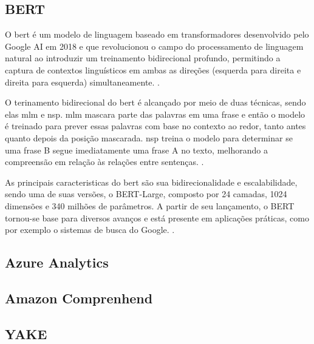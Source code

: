 \subsection{BERT}\label{subsec:bert}

O \gls{bert} é um modelo de linguagem baseado em transformadores desenvolvido pelo Google AI em 2018 e que revolucionou o campo do processamento de linguagem natural ao introduzir um treinamento bidirecional profundo, permitindo a captura de contextos linguísticos em ambas as direções (esquerda para direita e direita para esquerda) simultaneamente. \cite{Devlin2018}.

O terinamento bidirecional do \gls{bert} é alcançado por meio de duas técnicas, sendo elas \gls{mlm} e \gls{nsp}. \gls{mlm} mascara parte das palavras em uma frase e então o modelo é treinado para prever essas palavras com base no contexto ao redor, tanto antes quanto depois da posição mascarada. \gls{nsp} treina o modelo para determinar se uma frase B segue imediatamente uma frase A no texto, melhorando a compreensão em relação às relações entre sentenças. \cite{Devlin2018}.

As principais caracteristicas do \gls{bert} são sua bidirecionalidade e escalabilidade, sendo uma de suas versões, o BERT-Large, composto por 24 camadas, 1024 dimensões e 340 milhões de parâmetros. A partir de seu lançamento, o BERT tornou-se base para diversos avanços e está presente em aplicações práticas, como por exemplo o sistemas de busca do Google. \cite{Devlin2018}.

\subsection{Azure Analytics}\label{subsec:azure}


\subsection{Amazon Comprenhend}\label{subsec:comprenhend}


\subsection{YAKE}\label{subsec:yake}

